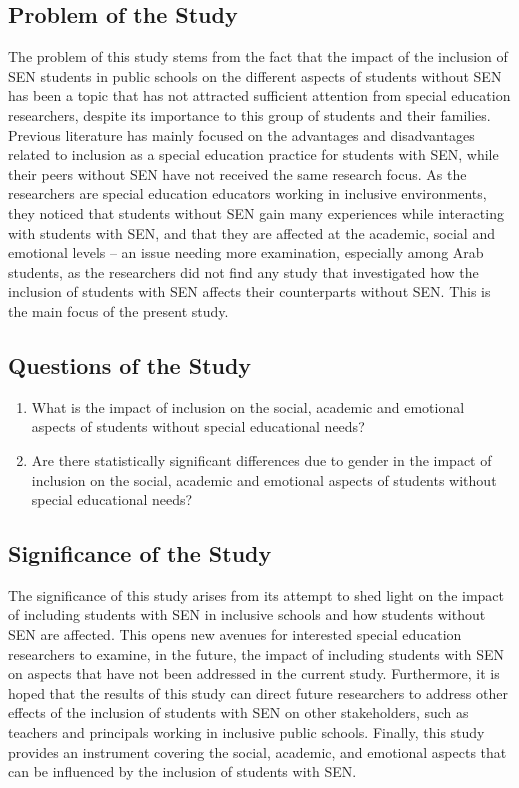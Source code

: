 \documentclass[10pt]{NSP1}
\begin{document}
	\subsection{Problem of the Study}

	The problem of this study stems from the fact that the impact of the inclusion of SEN students in public schools on the different aspects of students without SEN has been a topic that has not attracted sufficient attention from special education researchers, despite its importance to this group of students and their families. Previous literature has mainly focused on the advantages and disadvantages related to inclusion as a special education practice for students with SEN, while their peers without SEN have not received the same research focus. As the researchers are special education educators working in inclusive environments, they noticed that students without SEN gain many experiences while interacting with students with SEN, and that they are affected at the academic, social and emotional levels -- an issue needing more examination, especially among Arab students, as the researchers did not find any study that investigated how the inclusion of students with SEN affects their counterparts without SEN. This is the main focus of the present study.

	\subsection{Questions of the Study}

	\begin{enumerate}
		\item What is the impact of inclusion on the social, academic and emotional aspects of students without special educational needs?
		\item Are there statistically significant differences due to gender in the impact of inclusion on the social, academic and emotional aspects of students without special educational needs?
	\end{enumerate}

	\subsection{Significance of the Study}

	The significance of this study arises from its attempt to shed light on the impact of including students with SEN in inclusive schools and how students without SEN are affected. This opens new avenues for interested special education researchers to examine, in the future, the impact of including students with SEN on aspects that have not been addressed in the current study. Furthermore, it is hoped that the results of this study can direct future researchers to address other effects of the inclusion of students with SEN on other stakeholders, such as teachers and principals working in inclusive public schools. Finally, this study provides an instrument covering the social, academic, and emotional aspects that can be influenced by the inclusion of students with SEN.
\end{document}
